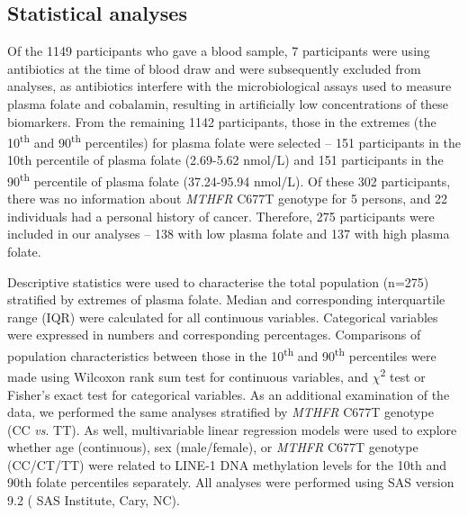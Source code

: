 \subsection{Statistical analyses} %
\noindent Of the 1149 participants who gave a blood sample, 7 participants were using antibiotics at the time of blood draw and were subsequently excluded from analyses, as antibiotics interfere with the microbiological assays used to measure plasma folate and cobalamin, resulting in artificially low concentrations of these biomarkers. From the remaining 1142 participants, those in the extremes (the 10\textsuperscript{th} and 90\textsuperscript{th} percentiles) for plasma folate were selected -- 151 participants in the 10th percentile of plasma folate (2.69-5.62 nmol/L) and 151 participants in the 90\textsuperscript{th} percentile of plasma folate (37.24-95.94 nmol/L). Of these 302 participants, there was no information about \emph{MTHFR} C677T genotype for 5 persons, and 22 individuals had a personal history of cancer. Therefore, 275 participants were included in our analyses -- 138 with low plasma folate and 137 with high plasma folate.

\noindent Descriptive statistics were used to characterise the total population (n=275) stratified by extremes of plasma folate. Median and corresponding interquartile range (IQR) were calculated for all continuous variables. Categorical variables were expressed in numbers and corresponding percentages. Comparisons of population characteristics between those in the 10\textsuperscript{th} and 90\textsuperscript{th} percentiles were made using Wilcoxon rank sum test for continuous variables, and $\chi$\textsuperscript{2} test or Fisher's exact test for categorical variables. As an additional examination of the data, we performed the same analyses stratified by \emph{MTHFR} C677T genotype (CC \emph{vs}. TT). As well, multivariable linear regression models were used to explore whether age (continuous), sex (male/female), or \emph{MTHFR} C677T genotype (CC/CT/TT) were related to LINE-1 DNA methylation levels for the 10th and 90th folate percentiles separately. All analyses were performed using SAS version 9.2 (
SAS Institute, Cary, NC). 

